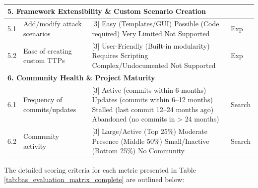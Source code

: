 \begin{longtable}{|l|p{4cm}|p{8cm}|l|}
    \multicolumn{4}{|l|}{\textbf{5. Framework Extensibility \& Custom Scenario Creation}} \\
    \hline
    5.1 & Add/modify attack scenarios~\cite{landauer2024,wang2025} & 
    [3] Easy (Templates/GUI) \newline 
    [2] Possible (Code required) \newline 
    [1] Very Limited \newline 
    [0] Not Supported & Exp \\ \hline
    5.2 & Ease of creating custom TTPs ~\cite{landauer2024,wang2025} & 
    [3] User-Friendly (Built-in modularity) \newline 
    [2] Requires Scripting \newline 
    [1] Complex/Undocumented \newline 
    [0] Not Supported & Exp \\ \hline
    
    \multicolumn{4}{|l|}{\textbf{6. Community Health \& Project Maturity}} \\
    \hline
    6.1 & Frequency of commits/updates~\cite{landauer2024} & 
    [3] Active (commits within 6 months) \newline 
    [2] Updates (commits within 6--12 months) \newline 
    [1] Stalled (last commit 12--24 months ago) \newline 
    [0] Abandoned (no commits in > 24 months) & Search \\ \hline
    6.2 & Community activity~\cite{landauer2024} & 
    [3] Large/Active (Top 25\%) \newline 
    [2] Moderate Presence (Middle 50\%) \newline 
    [1] Small/Inactive (Bottom 25\%) \newline 
    [0] No Community & Search \\ \hline
\end{longtable}

\noindent The detailed scoring criteria for each metric presented in Table \ref{tab:bas_evaluation_matrix_complete} are outlined below:

